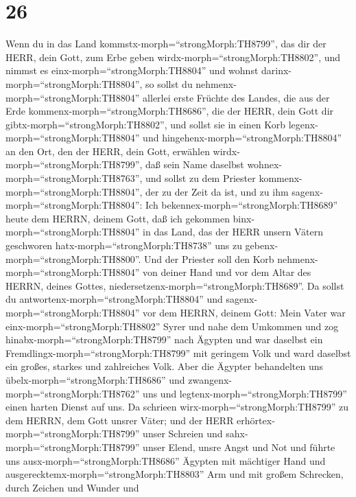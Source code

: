 \hypertarget{section-25}{%
\section{26}\label{section-25}}

 Wenn du in das Land kommstx-morph=``strongMorph:TH8799'',
das dir der HERR, dein Gott, zum Erbe geben
wirdx-morph=``strongMorph:TH8802'', und nimmst es
einx-morph=``strongMorph:TH8804'' und wohnst
darinx-morph=``strongMorph:TH8804'',  so sollst du
nehmenx-morph=``strongMorph:TH8804'' allerlei erste Früchte des Landes,
die aus der Erde kommenx-morph=``strongMorph:TH8686'', die der HERR,
dein Gott dir gibtx-morph=``strongMorph:TH8802'', und sollst sie in
einen Korb legenx-morph=``strongMorph:TH8804'' und
hingehenx-morph=``strongMorph:TH8804'' an den Ort, den der HERR, dein
Gott, erwählen wirdx-morph=``strongMorph:TH8799'', daß sein Name
daselbst wohnex-morph=``strongMorph:TH8763'',  und sollst zu
dem Priester kommenx-morph=``strongMorph:TH8804'', der zu der Zeit da
ist, und zu ihm sagenx-morph=``strongMorph:TH8804'': Ich
bekennex-morph=``strongMorph:TH8689'' heute dem HERRN, deinem Gott, daß
ich gekommen binx-morph=``strongMorph:TH8804'' in das Land, das der HERR
unsern Vätern geschworen hatx-morph=``strongMorph:TH8738'' uns zu
gebenx-morph=``strongMorph:TH8800''.  Und der Priester soll
den Korb nehmenx-morph=``strongMorph:TH8804'' von deiner Hand und vor
dem Altar des HERRN, deines Gottes,
niedersetzenx-morph=``strongMorph:TH8689''.  Da sollst du
antwortenx-morph=``strongMorph:TH8804'' und
sagenx-morph=``strongMorph:TH8804'' vor dem HERRN, deinem Gott: Mein
Vater war einx-morph=``strongMorph:TH8802'' Syrer und nahe dem Umkommen
und zog hinabx-morph=``strongMorph:TH8799'' nach Ägypten und war
daselbst ein Fremdlingx-morph=``strongMorph:TH8799'' mit geringem Volk
und ward daselbst ein großes, starkes und zahlreiches Volk. 
Aber die Ägypter behandelten uns übelx-morph=``strongMorph:TH8686'' und
zwangenx-morph=``strongMorph:TH8762'' uns und
legtenx-morph=``strongMorph:TH8799'' einen harten Dienst auf uns.
 Da schrieen wirx-morph=``strongMorph:TH8799'' zu dem HERRN,
dem Gott unsrer Väter; und der HERR
erhörtex-morph=``strongMorph:TH8799'' unser Schreien und
sahx-morph=``strongMorph:TH8799'' unser Elend, unsre Angst und Not
 und führte uns ausx-morph=``strongMorph:TH8686'' Ägypten
mit mächtiger Hand und ausgerecktemx-morph=``strongMorph:TH8803'' Arm
und mit großem Schrecken, durch Zeichen und Wunder  und
